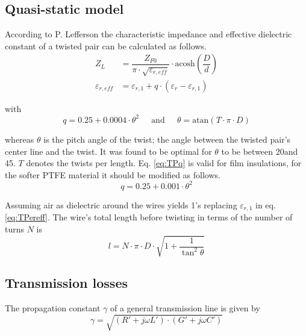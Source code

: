 \subsection{Quasi-static model}

According to P. Lefferson \cite{Lefferson} the characteristic
impedance and effective dielectric constant of a twisted pair can be
calculated as follows.
\begin{align}
Z_L &= \dfrac{Z_{F0}}{\pi\cdot\sqrt{\varepsilon_{r,eff}}}\cdot\textrm{acosh}\left(\dfrac{D}{d}\right)\\
\label{eq:TPereff}
\varepsilon_{r,eff} &= \varepsilon_{r,1} + q\cdot\left(\varepsilon_r - \varepsilon_{r,1}\right)
\end{align}

with
\begin{equation}
\label{eq:TPq}
q = 0.25 + 0.0004\cdot \theta^2
\;\;\;\; \textrm{ and } \;\;\;\;
\theta = \textrm{atan}\left(T\cdot\pi\cdot D\right)
\end{equation}

whereas $\theta$ is the pitch angle of the twist; the angle between
the twisted pair's center line and the twist.  It was found to be
optimal for $\theta$ to be between 20\degree and 45\degree.  $T$
denotes the twists per length.  Eq. \eqref{eq:TPq} is valid for film
insulations, for the softer PTFE material it should be modified as
follows.
\begin{equation}
q = 0.25 + 0.001\cdot \theta^2
\end{equation}

Assuming air as dielectric around the wires yields 1's replacing
$\varepsilon_{r,1}$ in eq. \eqref{eq:TPereff}.  The wire's total
length before twisting in terms of the number of turns $N$ is
\begin{equation}
l = N\cdot\pi\cdot D\cdot\sqrt{1 + \dfrac{1}{\tan^2{\theta}}}
\end{equation}

\subsection{Transmission losses}

The propagation constant $\gamma$ of a general transmission line is
given by
\begin{equation}
\gamma = \sqrt{\left(R' + j\omega L'\right)\cdot \left(G' + j\omega C'\right)}
\end{equation}

